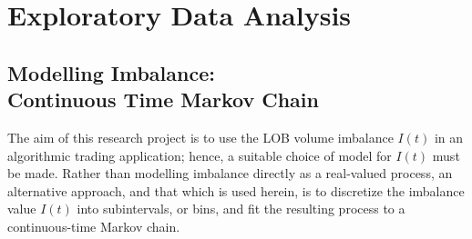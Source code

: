 \chapter{Exploratory Data Analysis}

\section[Modelling Imbalance: Continuous Time Markov Chain]{Modelling Imbalance: \texorpdfstring{\\}{} Continuous Time Markov Chain}
The aim of this research project is to use the LOB volume imbalance $I(t)$ in an algorithmic trading application; hence, a suitable choice of model for $I(t)$ must be made. Rather than modelling imbalance directly as a real-valued process, an alternative approach, and that which is used herein, is to discretize the imbalance value $I(t)$ into subintervals, or bins, and fit the resulting process to a continuous-time Markov chain.

